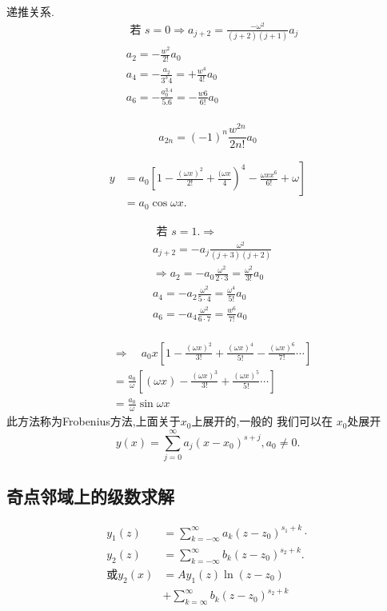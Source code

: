 递推关系.
$$
\begin{aligned}
& \text { 若 } s=0 \Rightarrow a_{j+2}=\frac{-\omega^2}{(j+2)(j+1)} a_j \\
& a_2=-\frac{w^2}{2 !} a_0 \\
& a_4=-\frac{a_2}{3^3 4}=+\frac{w^4}{4 !} a_0 \\
& a_6=-\frac{a_0^{3.4}}{5.6}=-\frac{w 6}{6 !} a_0 \\
&
\end{aligned}
$$

$$
a_{2 n}=(-1)^n \frac{w^{2 n}}{2 n !} a_0
$$

$$
\begin{aligned}
y & \left.=a_0\left[1-\frac{(\omega x)^2}{2 !}+\frac{(\omega x}{4}\right)^4-\frac{\omega x x^6}{6 !}+\omega\right] \\
& =a_0 \cos \omega x .
\end{aligned}
$$

$$
\begin{aligned}
& \text { 若 } s=1 . \Rightarrow \\
& a_{j+2}=-a_j \frac{\omega^2}{(j+3) (j+2)} \\
& \Rightarrow a_2=-a_0 \frac{\omega^2}{2 \cdot 3}=\frac{\omega^2}{3 !} a_0 \\
& a_4=-a_2 \frac{\omega^2}{5 \cdot 4}=\frac{\omega^4}{5 !} a_0 \\
& a_6=-a_4 \frac{\omega^2}{6\cdot 7}=\frac{w^6}{7 !} a_0 \\
\end{aligned}
$$

$$
\begin{aligned}
& \Rightarrow \quad a_0 x\left[1-\frac{(\omega x)^2}{3 !}+\frac{(\omega x)^{4}}{5 !}-\frac{(\omega x)^6}{7 !} \cdots\right] \\
& =\frac{a_0}{\omega}\left[(\omega x)-\frac{(\omega x)^3}{3 !}+\frac{(\omega x)^5}{5 !} \cdots\right] \\
& =\frac{a_0}{\omega} \sin \omega x
\end{aligned}
$$
此方法称为Frobenius方法,上面关于$x_0$上展开的,一般的
我们可以在 $x_0$处展开
$$
y(x)=\sum_{j=0}^{\infty} a_j\left(x-x_0\right)^{s+j}, a_0 \neq 0 .
$$


\subsection{奇点邻域上的级数求解}
$$
\begin{aligned}
y_1(z) & =\sum_{k=-\infty}^{\infty} a_k\left(z-z_0\right)^{s_1+k} \cdot \\
y_2(z) & =\sum_{k=-\infty}^{\infty} b_k\left(z-z_0\right)^{s_2+k} . \\
\text{或} y_2(x) & =A y_1(z) \ln \left(z-z_0\right) \\
& +\sum_{k=\infty}^{\infty} b_k\left(z-z_0\right)^{s_2+k}
\end{aligned}
$$


